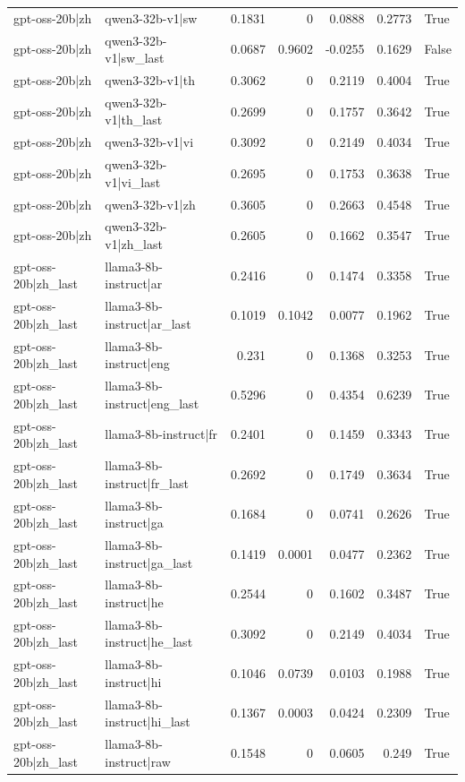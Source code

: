 \begin{table}
\begin{tabular}{l l r r r r l}
gpt-oss-20b|zh & qwen3-32b-v1|sw & 0.1831 & 0 & 0.0888 & 0.2773 & True \\
gpt-oss-20b|zh & qwen3-32b-v1|sw_last & 0.0687 & 0.9602 & -0.0255 & 0.1629 & False \\
gpt-oss-20b|zh & qwen3-32b-v1|th & 0.3062 & 0 & 0.2119 & 0.4004 & True \\
gpt-oss-20b|zh & qwen3-32b-v1|th_last & 0.2699 & 0 & 0.1757 & 0.3642 & True \\
gpt-oss-20b|zh & qwen3-32b-v1|vi & 0.3092 & 0 & 0.2149 & 0.4034 & True \\
gpt-oss-20b|zh & qwen3-32b-v1|vi_last & 0.2695 & 0 & 0.1753 & 0.3638 & True \\
gpt-oss-20b|zh & qwen3-32b-v1|zh & 0.3605 & 0 & 0.2663 & 0.4548 & True \\
gpt-oss-20b|zh & qwen3-32b-v1|zh_last & 0.2605 & 0 & 0.1662 & 0.3547 & True \\
gpt-oss-20b|zh_last & llama3-8b-instruct|ar & 0.2416 & 0 & 0.1474 & 0.3358 & True \\
gpt-oss-20b|zh_last & llama3-8b-instruct|ar_last & 0.1019 & 0.1042 & 0.0077 & 0.1962 & True \\
gpt-oss-20b|zh_last & llama3-8b-instruct|eng & 0.231 & 0 & 0.1368 & 0.3253 & True \\
gpt-oss-20b|zh_last & llama3-8b-instruct|eng_last & 0.5296 & 0 & 0.4354 & 0.6239 & True \\
gpt-oss-20b|zh_last & llama3-8b-instruct|fr & 0.2401 & 0 & 0.1459 & 0.3343 & True \\
gpt-oss-20b|zh_last & llama3-8b-instruct|fr_last & 0.2692 & 0 & 0.1749 & 0.3634 & True \\
gpt-oss-20b|zh_last & llama3-8b-instruct|ga & 0.1684 & 0 & 0.0741 & 0.2626 & True \\
gpt-oss-20b|zh_last & llama3-8b-instruct|ga_last & 0.1419 & 0.0001 & 0.0477 & 0.2362 & True \\
gpt-oss-20b|zh_last & llama3-8b-instruct|he & 0.2544 & 0 & 0.1602 & 0.3487 & True \\
gpt-oss-20b|zh_last & llama3-8b-instruct|he_last & 0.3092 & 0 & 0.2149 & 0.4034 & True \\
gpt-oss-20b|zh_last & llama3-8b-instruct|hi & 0.1046 & 0.0739 & 0.0103 & 0.1988 & True \\
gpt-oss-20b|zh_last & llama3-8b-instruct|hi_last & 0.1367 & 0.0003 & 0.0424 & 0.2309 & True \\
gpt-oss-20b|zh_last & llama3-8b-instruct|raw & 0.1548 & 0 & 0.0605 & 0.249 & True \\

\end{tabular}
\end{table}
